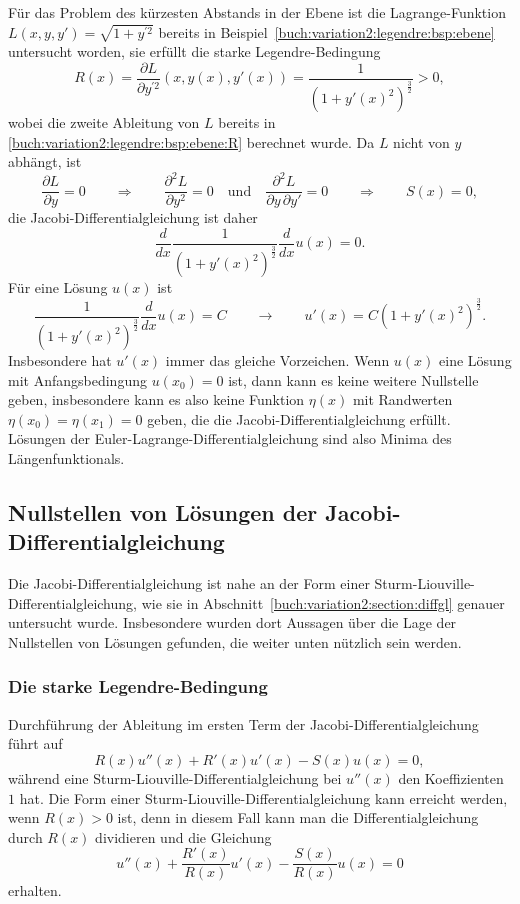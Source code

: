 \begin{beispiel}
Für das Problem des kürzesten Abstands in der Ebene ist
die Lagrange-Funktion $L(x,y,y')=\sqrt{1+y^{\prime 2}}$ bereits
in Beispiel~\ref{buch:variation2:legendre:bsp:ebene}
untersucht worden, sie erfüllt die starke Legendre-Bedingung
\[
R(x)
=
\frac{\partial L}{\partial y^{\prime 2}}(x,y(x),y'(x))
=
\frac{1}{(1+y'(x)^2)^{\frac32}} > 0,
\]
wobei die zweite Ableitung von $L$ bereits in
\eqref{buch:variation2:legendre:bsp:ebene:R}
berechnet wurde.
Da $L$ nicht von $y$ abhängt, ist
\[
\frac{\partial L}{\partial y}=0
\qquad\Rightarrow\qquad
\frac{\partial^2L}{\partial y^2}=0
\quad\text{und}\quad
\frac{\partial^2L}{\partial y\,\partial y'}=0
\qquad\Rightarrow\qquad
S(x)=0,
\]
die Jacobi-Differentialgleichung ist daher
\begin{equation}
\frac{d}{dx} \frac{1}{(1+y'(x)^2)^{\frac32}} \frac{d}{dx} u(x) = 0.
\label{buch:variation2:jacobi:eqn:ebeneQ}
\end{equation}
Für eine Lösung $u(x)$ ist
\[
\frac{1}{(1+y'(x)^2)^{\frac32}}
\frac{d}{dx} u(x) = C
\qquad\rightarrow\qquad
u'(x)
=
C(1+y'(x)^2)^{\frac32}.
\]
Insbesondere hat $u'(x)$ immer das gleiche Vorzeichen.
Wenn $u(x)$ eine Lösung mit Anfangsbedingung $u(x_0)=0$ ist, dann
kann es keine weitere Nullstelle geben, insbesondere kann es
also keine Funktion $\eta(x)$ mit Randwerten $\eta(x_0)=\eta(x_1)=0$
geben, die die Jacobi-Differentialgleichung erfüllt.
Lösungen der Euler-Lagrange-Differentialgleichung sind also Minima
des Längenfunktionals.
\end{beispiel}

%
%
\subsection{Nullstellen von Lösungen der Jacobi-Differentialgleichung
\label{buch:variation2:jacobi:subection:nullstellen}}
Die Jacobi-Differentialgleichung ist nahe an der Form einer
Sturm-Liouville-Differential\-gleichung,
wie sie in Abschnitt~\ref{buch:variation2:section:diffgl} genauer
untersucht wurde.
Insbesondere wurden dort Aussagen über die Lage der Nullstellen von
Lösungen gefunden, die weiter unten nützlich sein werden.

%
%
\subsubsection{Die starke Legendre-Bedingung}
Durchführung der Ableitung im ersten Term der Jacobi-Differentialgleichung
führt auf
\[
R(x) u''(x) + R'(x) u'(x) - S(x) u(x) = 0,
\]
während eine Sturm-Liouville-Differentialgleichung bei $u''(x)$ den
Koeffizienten $1$ hat.
Die Form einer Sturm-Liouville-Differentialgleichung kann erreicht
werden, wenn $R(x)>0$ ist, denn in diesem Fall kann man die
Differentialgleichung durch $R(x)$ dividieren und die Gleichung
\[
u''(x) + \frac{R'(x)}{R(x)} u'(x) -\frac{S(x)}{R(x)} u(x) = 0
\]
erhalten.

